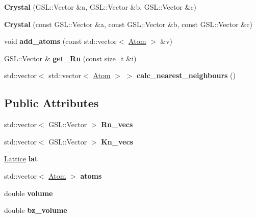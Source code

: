 \begin{DoxyCompactItemize}
{\bfseries Crystal} (G\+S\+L\+::\+Vector \&a, G\+S\+L\+::\+Vector \&b, G\+S\+L\+::\+Vector \&c)
\item 
\mbox{\label{classCrystal_a731c41bd979ebae689c9c37546ebcb94}} 
{\bfseries Crystal} (const G\+S\+L\+::\+Vector \&a, const G\+S\+L\+::\+Vector \&b, const G\+S\+L\+::\+Vector \&c)
\item 
\mbox{\label{classCrystal_a5b6c668fc1d66d1069ed4f24348317a9}} 
void {\bfseries add\+\_\+atoms} (const std\+::vector$<$ \hyperlink{classAtom}{Atom} $>$ \&v)
\item 
\mbox{\label{classCrystal_ad3d68928046871d142b88bdc98219ff2}} 
G\+S\+L\+::\+Vector \& {\bfseries get\+\_\+\+Rn} (const size\+\_\+t \&i)
\item 
\mbox{\label{classCrystal_a87bfc2e2f34dd9c1344ed1aeb4f56d8c}} 
std\+::vector$<$ std\+::vector$<$ \hyperlink{classAtom}{Atom} $>$ $>$ {\bfseries calc\+\_\+nearest\+\_\+neighbours} ()
\end{DoxyCompactItemize}
\subsection*{Public Attributes}
\begin{DoxyCompactItemize}
\item 
\mbox{\label{classCrystal_ad8a47a7a1bff618d0f8086b0f6dc8923}} 
std\+::vector$<$ G\+S\+L\+::\+Vector $>$ {\bfseries Rn\+\_\+vecs}
\item 
\mbox{\label{classCrystal_abe2274d5f8cb3f04b86b2f12a41be29e}} 
std\+::vector$<$ G\+S\+L\+::\+Vector $>$ {\bfseries Kn\+\_\+vecs}
\item 
\mbox{\label{classCrystal_a40f8e54181ebde8cbfd5cdfca4c566a0}} 
\hyperlink{classLattice}{Lattice} {\bfseries lat}
\item 
\mbox{\label{classCrystal_a3bf1b97769d7ebb26f5b0947887c0b3f}} 
std\+::vector$<$ \hyperlink{classAtom}{Atom} $>$ {\bfseries atoms}
\item 
\mbox{\label{classCrystal_a0a6ca7dd06a76590ce88bfd9140f9441}} 
double {\bfseries volume}
\item 
\mbox{\label{classCrystal_a34c90595f775055b60f929831550d91b}} 
double {\bfseries bz\+\_\+volume}
\end{DoxyCompactItemize}


